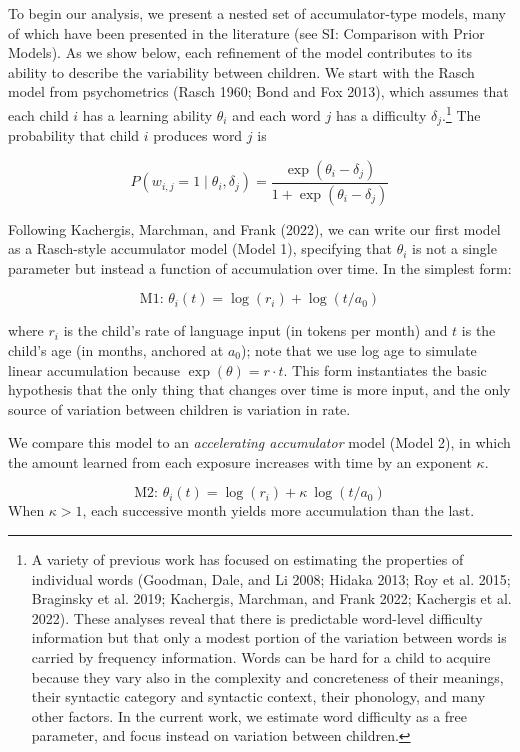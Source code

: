 \documentclass[
  11pt,
]{article}
\begin{document}
To begin our analysis, we present a nested set of accumulator-type
models, many of which have been presented in the literature (see SI:
Comparison with Prior Models). As we show below, each refinement of the
model contributes to its ability to describe the variability between
children. We start with the Rasch model from psychometrics (Rasch 1960;
Bond and Fox 2013), which assumes that each child \(i\) has a learning
ability \(\theta_i\) and each word \(j\) has a difficulty
\(\delta_j\).\footnote{A variety of previous work has focused on
  estimating the properties of individual words (Goodman, Dale, and Li
  2008; Hidaka 2013; Roy et al. 2015; Braginsky et al. 2019; Kachergis,
  Marchman, and Frank 2022; Kachergis et al. 2022). These analyses
  reveal that there is predictable word-level difficulty information but
  that only a modest portion of the variation between words is carried
  by frequency information. Words can be hard for a child to acquire
  because they vary also in the complexity and concreteness of their
  meanings, their syntactic category and syntactic context, their
  phonology, and many other factors. In the current work, we estimate
  word difficulty as a free parameter, and focus instead on variation
  between children.} The probability that child \(i\) produces word
\(j\) is

\[P(w_{i,j}=1 \mid \theta_i, \delta_j) =\frac{\exp(\theta_i - \delta_j)}{1 + \exp(\theta_i - \delta_j)}\]

Following Kachergis, Marchman, and Frank (2022), we can write our first
model as a Rasch-style accumulator model (Model 1), specifying that
\(\theta_i\) is not a single parameter but instead a function of
accumulation over time. In the simplest form:

\[\text{M1: }\theta_i(t)  = \log(r_i) + \log(t/a_0)\]

\noindent where \(r_i\) is the child's rate of language input (in tokens
per month) and \(t\) is the child's age (in months, anchored at
\(a_0\)); note that we use log age to simulate linear accumulation
because \(\exp(\theta) = r \cdot t\). This form instantiates the basic
hypothesis that the only thing that changes over time is more input, and
the only source of variation between children is variation in rate.

We compare this model to an \emph{accelerating accumulator} model (Model
2), in which the amount learned from each exposure increases with time
by an exponent \(\kappa\).

\[\text{M2: }\theta_i(t)  = \log(r_i) + \kappa ~ \log(t/a_0)\]
\noindent When \(\kappa>1\), each successive month yields more
accumulation than the last.
\end{document}
